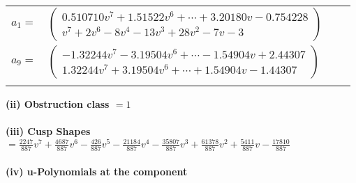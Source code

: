 \documentclass[1p]{elsarticle_modified}
\theoremstyle{definition}
\begin{document}
\begin{tabular}{m{7pt} m{180pt} m{7pt} m{180pt} }
\flushright $a_{1}=$&$\begin{pmatrix}0.510710 v^{7}+1.51522 v^{6}+\cdots+3.20180 v-0.754228\\v^7+2 v^6-8 v^4-13 v^3+28 v^2-7 v-3\end{pmatrix}$ \\
\flushright $a_{9}=$&$\begin{pmatrix}-1.32244 v^{7}-3.19504 v^{6}+\cdots-1.54904 v+2.44307\\1.32244 v^{7}+3.19504 v^{6}+\cdots+1.54904 v-1.44307\end{pmatrix}$\\&\end{tabular}
\flushleft \textbf{(ii) Obstruction class $= 1$}\\~\\
\flushleft \textbf{(iii) Cusp Shapes $= \frac{2247}{887} v^7+\frac{4687}{887} v^6-\frac{426}{887} v^5-\frac{21184}{887} v^4-\frac{35807}{887} v^3+\frac{61378}{887} v^2+\frac{5411}{887} v-\frac{17810}{887}$}\\~\\
\newpage\renewcommand{\arraystretch}{1}
\flushleft \textbf{(iv) u-Polynomials at the component}\newline \\
\end{document}
